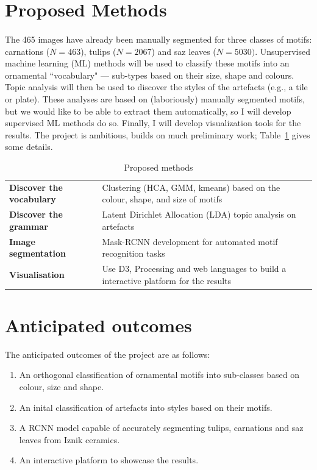 \documentclass[10pt]{article}
\begin{document}
\section*{Proposed Methods}
\paragraph{} The 465 images have already been manually segmented for three classes of motifs: carnations ($N=463$), tulips ($N=2067$) and saz leaves ($N=5030)$. Unsupervised machine learning (ML) methods will be used to classify these motifs into an ornamental ``vocabulary" --- sub-types based on their size, shape and colours. Topic analysis  will then be used to discover the styles of the artefacts (e.g., a tile or plate). These analyses are based on (laboriously) manually segmented motifs, but we would like to be able to extract them automatically, so I will develop supervised ML methods do so. Finally, I will develop visualization tools for the results. The project is ambitious, builds on much preliminary work; Table~\ref{Tab:methods} gives some details.

\begin{table}[ht]
\caption{Proposed methods}
\begin{tabular}{l|l}
\cline{1-2}
\small
\textbf{Discover the vocabulary} & Clustering (HCA, GMM, kmeans) based on the colour, shape, and size of motifs\\ \cline{1-2}
\textbf{Discover the grammar}  & Latent Dirichlet Allocation (LDA) topic analysis on artefacts \\ \cline{1-2}
\textbf{Image segmentation}   & Mask-RCNN development for automated motif recognition tasks\\ \cline{1-2}
\textbf{Visualisation}& Use D3, Processing and web languages to build a interactive platform for the results \\ \cline{1-2}
\end{tabular}
\label{Tab:methods}
\end{table}
\section*{Anticipated outcomes}

The anticipated outcomes of the project are as follows:

\begin{enumerate}
    \item An orthogonal classification of ornamental motifs into sub-classes based on colour, size and shape.
    \item An inital classification of artefacts into styles based on their motifs.
    \item A RCNN model capable of accurately segmenting tulips, carnations and saz leaves from Iznik ceramics.
    \item An interactive platform to showcase the results.
\end{enumerate}
\end{document}
